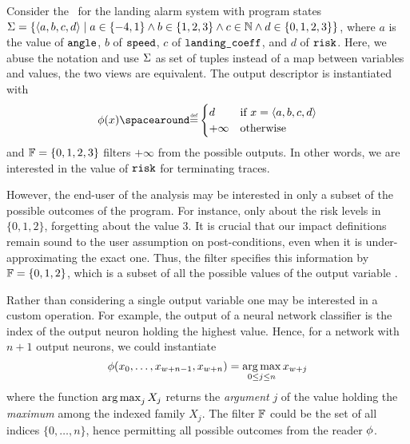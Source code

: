\begin{example}
  Consider the~ for the landing alarm system with program states $\Sigma=\{\langle a, b, c, d \rangle \mid a\in\{-4,1\}\land b\in\{1,2,3\}\land c\in\mathbb{N} \land d\in\{0,1,2,3\}\}$, where $a$ is the value of $\texttt{angle}$, $b$ of $\texttt{speed}$, $c$ of $\texttt{landing\_coeff}$, and $d$ of $\texttt{risk}$.
  Here, we abuse the notation and use $\Sigma$ as set of tuples instead of a map between variables and values, the two views are equivalent.
  The output descriptor is instantiated with
  \[
  \reader(x) \DefeQ \begin{cases}
    d & \text{if } x = \langle a, b, c, d \rangle \\
    +\infty & \text{otherwise}
  \end{cases}
  \]
  and $\mathbb{F}=\{0,1,2,3\}$ filters $+\infty$ from the possible outputs.
  In other words, we are interested in the value of $\texttt{risk}$ for terminating traces.

  However, the end-user of the analysis may be interested in only a subset of the possible outcomes of the program.
  For instance, only about the risk levels in $\{0, 1, 2\}$, forgetting about the value $3$.
  It is crucial that our impact definitions remain sound to the user assumption on post-conditions, even when it is under-approximating the exact one.
  Thus, the filter specifies this information by $\mathbb{F}=\{0, 1, 2\}$, which is a subset of all the possible values of the output variable \z.
\end{example}

\begin{example}
  Rather than considering a single output variable one may be interested in a custom operation.
  For example, the output of a neural network classifier is the index of the output neuron holding the highest value.
  Hence, for a network with $n+1$ output neurons, we could instantiate
  \[
    \phi(x_0,\dots,x_{w+n-1},x_{w+n})=\operatorname*{arg\,max}_{0\le j\le n} x_{w+j}
  \] where the function $\operatorname*{arg\,max}_j X_j$ returns the \textit{argument} $j$ of the value holding the \textit{maximum} among the indexed family $X_j$.
  The filter $\mathbb{F}$ could be the set of all indices $\{0,\dots,n\}$, hence permitting all possible outcomes from the reader $\phi$.
\end{example}




